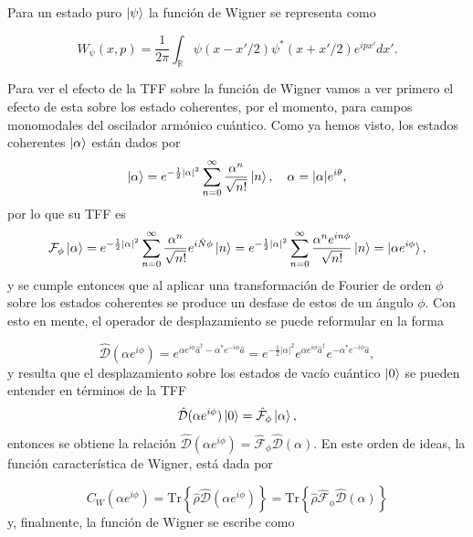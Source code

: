         Para un estado puro $\ket{\psi}$ la función de Wigner se representa como 

        \begin{equation}
            W_\psi(x,p) =\frac{1}{2\pi} \int_\mathbb{R}\psi(x-x'/2)\psi^*(x+x'/2)e^{ipx'}dx'.
        \end{equation}

        Para ver el efecto de la TFF sobre la función de Wigner vamos a ver primero el efecto de esta sobre los estado coherentes, por el momento, para campos monomodales del oscilador armónico cuántico. Como ya hemos visto, los estados coherentes $\ket{\alpha}$ están dados por
        \begin{equation}
            \ket{\alpha} = e^{-\frac{1}{2}|\alpha|^2} \sum_{n=0}^{\infty} \frac{\alpha^n}{\sqrt{n!}}\ket{n},\quad \alpha = |\alpha|e^{i\theta},
        \end{equation}
        por lo que su TFF es
        \begin{equation}
            \mathcal{F}_\phi \ket{\alpha} = e^{-\frac{1}{2}|\alpha|^2} \sum_{n=0}^{\infty} \frac{\alpha^n}{\sqrt{n!}}e^{i\hat{N}\phi}\ket{n} = e^{-\frac{1}{2}|\alpha|^2} \sum_{n=0}^{\infty} \frac{\alpha^n e^{in\phi} }{\sqrt{n!}}\ket{n}  = \ket{\alpha e^{i\phi}},
        \end{equation}
        y se cumple entonces que al aplicar una transformación de Fourier de orden $\phi$ sobre los estados coherentes se produce un desfase de estos de un ángulo $\phi$. Con esto en mente, el operador de desplazamiento se puede reformular en la forma

        \begin{equation}
            \hat{\mathcal{D}}(\alpha e^{i\phi}) = e^{\alpha e^{i\phi}\hat{a}^\dagger - \alpha^*e^{-i\phi}\hat{a}} = e^{-\frac{1}{2}|\alpha|^2}e^{\alpha e^{i\phi}\hat{a}^\dagger} e^{-\alpha^* e^{-i\phi}\hat{a}}, 
        \end{equation}
        y resulta que el desplazamiento sobre los estados de vacío cuántico $\ket{0}$ se pueden entender en términos de la TFF
        \begin{equation}
            \hat{\mathcal{D}}(\alpha e^{i\phi})\ket{0} = \hat{\mathcal{F}}_\phi\ket{\alpha},
        \end{equation}
        entonces se obtiene la relación $\hat{\mathcal{D}}(\alpha e^{i\phi}) = \hat{\mathcal{F}}_\phi \hat{\mathcal{D}}(\alpha)$. En este orden de ideas, la función característica de Wigner, está dada por

        \begin{equation}
            C_W(\alpha e^{i\phi}) = \mathrm{Tr}\left\{ \hat{\rho}\hat{\mathcal{D}}(\alpha e^{i\phi}) \right\} = \mathrm{Tr} \left\{ \hat{\rho} \hat{\mathcal{F}}_\phi \hat{\mathcal{D}}(\alpha) \right\}
        \end{equation}
        y, finalmente, la función de Wigner  se escribe como

